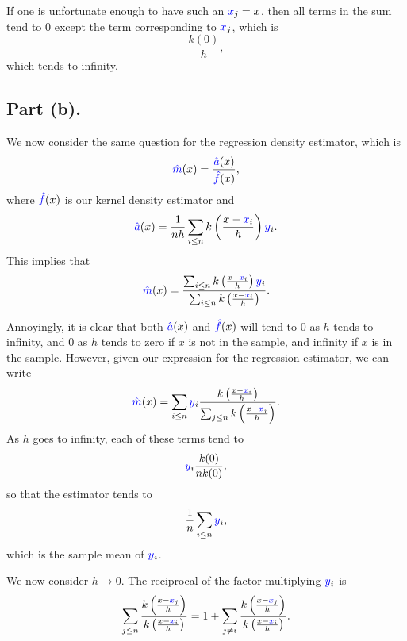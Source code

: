 \documentclass{article}
\renewcommand{\r}[1]{\textcolor{blue}{#1}}
\begin{document}
If one is unfortunate enough to have such an $\r{x}_{j}=x$, then all terms in the sum tend to 0 except the term corresponding to $\r{x}_{j}$, which is
\begin{equation} \frac{k(0)}{h},\end{equation}
which tends to infinity.

\subsection{Part (b).}
We now consider the same question for the regression density estimator, which is
\begin{equation} \r{\hat{m}}(x) = \frac{\r{\hat{a}}(x)}{\r{\hat{f}}(x)},\end{equation}
where $\r{\hat{f}}(x)$ is our kernel density estimator and
\begin{equation} \r{\hat{a}}(x) = \frac{1}{nh}\sum_{i\leq n} k\left(\frac{x-\r{x}_{i}}{h}\right)\r{y}_{i}.\end{equation}
This implies that
\begin{equation} \r{\hat{m}}(x) = \frac{\sum_{i\leq n}k\left(\frac{x-\r{x}_{i}}{h}\right)\r{y}_{i}}{\sum_{i\leq n} k\left(\frac{x-\r{x}_{i}}{h}\right)}.\end{equation}

Annoyingly, it is clear that both $\r{\hat{a}}(x)$ and $\r{\hat{f}}(x)$ will tend to 0 as $h$ tends to infinity, and 0 as $h$ tends to zero if $x$ is not in the sample, and infinity if $x$ is in the sample. However, given our expression for the regression estimator, we can write
\begin{equation} \r{\hat{m}}(x) = \sum_{i\leq n}\r{y}_{i}\frac{k\left(\frac{x-\r{x}_{i}}{h}\right)}{\sum_{j\leq n}k\left(\frac{x-\r{x}_{j}}{h}\right)}.\end{equation}
As $h$ goes to infinity, each of these terms tend to 
\begin{equation} \r{y}_{i}\frac{k(0)}{nk(0)},\end{equation}
so that the estimator tends to
\begin{equation} \frac{1}{n}\sum_{i\leq n} \r{y}_{i},\end{equation}
which is the sample mean of $\r{y}_{i}$. 

We now consider $h\to0$. The reciprocal of the factor multiplying $\r{y}_{i}$ is
\begin{equation}\label{eqn:12} \sum_{j\leq n} \frac{k\left(\frac{x-\r{x}_{j}}{h}\right)}{k\left(\frac{x-\r{x}_{i}}{h}\right)} = 1+\sum_{j\neq i} \frac{k\left(\frac{x-\r{x}_{j}}{h}\right)}{k\left(\frac{x-\r{x}_{i}}{h}\right)}.\end{equation}
\end{document}
